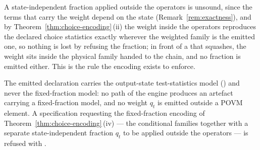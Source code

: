 
A state-independent fraction applied outside the operators is unsound, since
the terms that carry the weight depend on the state
(Remark~\ref{rem:exactness}), and by
Theorem~\ref{thm:choice-encoding}\,(ii) the weight inside the operators
reproduces the declared choice statistics exactly wherever the weighted
family is the emitted one, so nothing is lost by refusing the fraction; in
front of a  that squashes, the weight sits inside the
physical family handed to the chain, and no fraction is emitted either. This
is the rule the encoding exists to enforce.

\begin{requirement}\label{req:no-fixed-fraction}
The emitted declaration carries the output-state test-statistics model
() and never the fixed-fraction model: no path of the
engine produces an artefact carrying a fixed-fraction model, and no weight
$q_t$ is emitted outside a POVM element. A specification requesting the
fixed-fraction encoding of Theorem~\ref{thm:choice-encoding}\,(iv) --- the conditional
families together with a separate state-independent fraction $q_t$ to be
applied outside the operators --- is refused with
.
\end{requirement}
